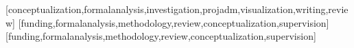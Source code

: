 \documentclass[english]{textolivre}
\begin{document}
\begin{contributors}
[conceptualization,formalanalysis,investigation,projadm,visualization,writing,review]
[funding,formalanalysis,methodology,review,conceptualization,supervision]
[funding,formalanalysis,methodology,review,conceptualization,supervision]
\end{contributors}
\end{document}
